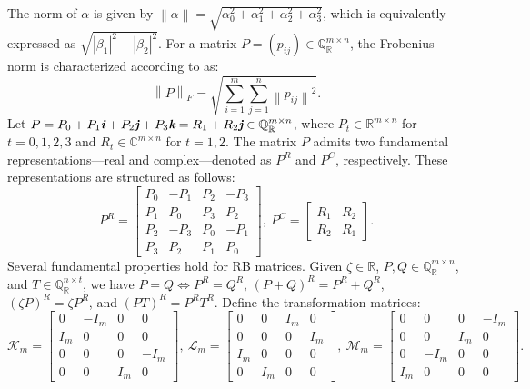 \documentclass[preprint,11pt,3p]{elsarticle}
\newcommand\norm[1]{\left\lVert#1\right\rVert}
\def \R{{\mathbb R}}
\def \C{{\mathbb C}}
\def \QR{\mathbb{Q}_\mathbb{R}}
\def \i{\textit{\textbf{i}}}
\def \j{\textit{\textbf{j}}}
\def \k{\textit{\textbf{k}}}
\begin{document}
The norm of $\alpha$ is given by $\norm{\alpha}= \sqrt{\alpha_0^2+ \alpha_1^2+ \alpha_2^2+ \alpha_3^2}$, which is equivalently expressed as $\sqrt{|\beta_1|^2+|\beta_2|^2}$. For a matrix $P = (p_{ij}) \in \QR^{m \times n}$, the Frobenius norm is characterized according to \cite{MR4137050} as:
\begin{equation}\label{eq2.1}
	\norm{P}_F= \sqrt{\sum_{i= 1}^{m} \sum_{j= 1}^{n} \norm{p_{ij}}^{2}}.
\end{equation}
Let $P=P_0+ P_1\i+ P_2\j+ P_3\k= R_1+R_2\j \in \QR^{m \times n}$, where $P_t \in \R^{m \times n}$ for $t=0,1,2,3$ and $R_t \in \C^{m \times n}$ for $t=1,2$. The matrix $P$ admits two fundamental representations—real and complex—denoted as $P^R$ and $P^C$, respectively. These representations are structured as follows:
\begin{equation}\label{eq2.2}
	P^R= \begin{bmatrix}
		P_0  &  -P_1  &  P_2  &  -P_3 \\
		P_1   &   P_0  &  P_3  &   P_2  \\
		P_2   &  -P_3 & P_0  &  -P_1  \\
		P_3  &  P_2  &  P_1  &  P_0 
	\end{bmatrix}, ~ P^C= \begin{bmatrix}
		R_1 & R_2 \\
		R_2 & R_1 
	\end{bmatrix}.
\end{equation}
Several fundamental properties hold for RB matrices. Given $\zeta \in \R$, $P, Q \in \QR^{m \times n}$, and $T \in \QR^{n \times t}$, we have $P= Q \iff P^R= Q^R$, $(P+Q)^R= P^R+ Q^R$, $(\zeta P)^R= \zeta P^R$, and $(PT)^R = P^R T^R$. Define the transformation matrices:
\begin{equation*}
	\mathcal{K}_m= \begin{bmatrix}
		0      &   -I_m   &  0     & 0    \\
		I_m  &    0        &  0     & 0    \\
		0      &    0        &  0     & -I_m \\
		0      &    0        &  I_m & 0
	\end{bmatrix}, ~
	\mathcal{L}_m= \begin{bmatrix}
		0      &   0      &  I_m   & 0           \\
		0      &    0     &  0       &   I_m     \\
		I_m  &    0     &  0       & 0           \\
		0      &    I_m &  0       & 0
	\end{bmatrix}, ~
	\mathcal{M}_m= \begin{bmatrix}
		0      &   0      &  0       & -I_m           \\
		0      &    0     &  I_m    &  0    \\
		0      &  -I_m  &  0       & 0           \\
		I_m   &    0     &  0       & 0
	\end{bmatrix}.
\end{equation*}
\end{document}
